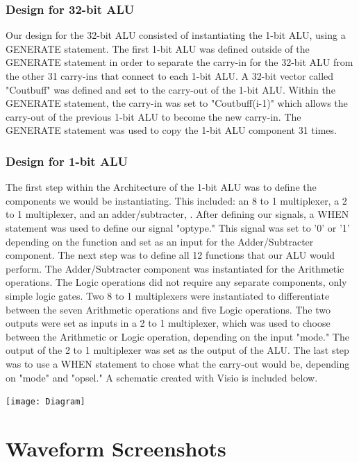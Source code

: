 \documentclass[paper=letter, fontsize=11pt]{scrartcl}
\numberwithin{equation}{section} %
\numberwithin{figure}{section} %
\numberwithin{table}{section} %
\begin{document}
\subsubsection{Design for 32-bit ALU}
\begin{flushleft}
	Our design for the 32-bit ALU consisted of instantiating the 1-bit ALU, using a GENERATE statement. The first 1-bit ALU was defined outside of the GENERATE statement in order to separate the carry-in for the 32-bit ALU from the other 31 carry-ins that connect to each 1-bit ALU. A 32-bit vector called "Coutbuff" was defined and set to the carry-out of the 1-bit ALU. Within the GENERATE statement, the carry-in was set to "Coutbuff(i-1)" which allows the carry-out of the previous 1-bit ALU to become the new carry-in. The GENERATE statement was used to copy the 1-bit ALU component 31 times.  	
\end{flushleft}

\subsubsection{Design for 1-bit ALU}
\begin{flushleft}
	The first step within the Architecture of the 1-bit ALU was to define the components we would be instantiating. This included: an 8 to 1 multiplexer, a 2 to 1 multiplexer, and an adder/subtracter, . After defining our signals, a WHEN statement was used to define our signal "optype." This signal was set to '0' or '1' depending on the function and set as an input for the Adder/Subtracter component. The next step was to define all 12 functions that our ALU would perform. The Adder/Subtracter component was instantiated for the Arithmetic operations. The Logic operations did not require any separate components, only simple logic gates. Two 8 to 1 multiplexers were instantiated to differentiate between the seven Arithmetic operations and five Logic operations. The two outputs were set as inputs in a 2 to 1 multiplexer, which was used to choose between the Arithmetic or Logic operation, depending on the input "mode." The output of the 2 to 1 multiplexer was set as the output of the ALU. The last step was to use a WHEN statement to chose what the carry-out would be, depending on "mode" and "opsel." A schematic created with Visio is included below.      
\end{flushleft}
	\centering
			\texttt{[image: Diagram]}
				\label{fig:Diagram}

\section{Waveform Screenshots}
\end{document}
